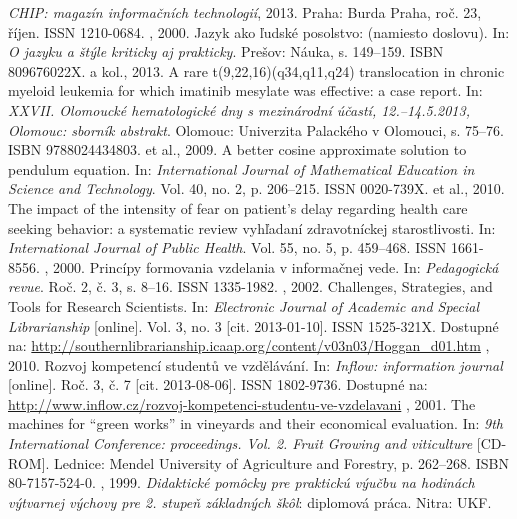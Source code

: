 \documentclass[thesismargins, english, thesislinespacing, twoside, openright, upjsfrontpage]{rnthesis}
\begin{document}
\begin{thebibliography}{9}
  \emph{CHIP: magazín informačních technologií}, 2013. Praha: Burda Praha, roč. 23, říjen. ISSN 1210-0684.
  , 2000. Jazyk ako ľudské posolstvo: (namiesto doslovu). In: \emph{O jazyku a štýle kriticky aj prakticky}. Prešov: Náuka, s. 149--159. ISBN 809676022X.
   a kol., 2013. A rare t(9,22,16)(q34,q11,q24) translocation in chronic myeloid leukemia for which imatinib mesylate was effective: a case report. In: \emph{XXVII. Olomoucké hematologické dny s mezinárodní účastí, 12.--14.5.2013, Olomouc: sborník abstrakt}. Olomouc: Univerzita Palackého v Olomouci, s. 75--76. ISBN 9788024434803.
   et al., 2009. A better cosine approximate solution to pendulum equation. In: \emph{International Journal of Mathematical Education in Science and Technology}. Vol. 40, no. 2, p. 206--215. ISSN 0020-739X.
   et al., 2010. The impact of the intensity of fear on patient's delay regarding health care seeking behavior: a systematic review vyhľadaní zdravotníckej starostlivosti. In: \emph{International Journal of Public Health}. Vol. 55, no. 5, p. 459--468. ISSN 1661-8556.
  , 2000. Princípy formovania vzdelania v informačnej vede. In: \emph{Pedagogická revue}. Roč. 2, č. 3, s. 8--16. ISSN 1335-1982.
  , 2002. Challenges, Strategies, and Tools for Research Scientists. In: \emph{Electronic Journal of Academic and Special Librarianship} [online]. Vol. 3, no. 3 [cit. 2013-01-10]. ISSN 1525-321X. Dostupné na: \url{http://southernlibrarianship.icaap.org/content/v03n03/Hoggan_d01.htm}
  , 2010. Rozvoj kompetencí studentů ve vzdělávání. In: \emph{Inflow: information journal} [online]. Roč. 3, č. 7 [cit. 2013-08-06]. ISSN 1802-9736. Dostupné na: \url{http://www.inflow.cz/rozvoj-kompetenci-studentu-ve-vzdelavani}
  , 2001. The machines for ``green works'' in vineyards and their economical evaluation. In: \emph{9th International Conference: proceedings. Vol. 2. Fruit Growing and viticulture} [CD-ROM]. Lednice: Mendel University of Agriculture and Forestry, p. 262--268. ISBN 80-7157-524-0.
  , 1999. \emph{Didaktické pomôcky pre praktickú výučbu na hodinách výtvarnej výchovy pre 2. stupeň základných škôl}: diplomová práca. Nitra: UKF.

\end{thebibliography}
\end{document}
